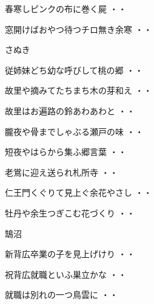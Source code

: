 \begin{shiika}春寒しピンクの布に巻く屍
\hfill{・・}\end{shiika}
\vspace{0.6cm}
\begin{shiika}窓開けばおやつ待つチロ無き余寒
\hfill{・・}\end{shiika}
\vspace{0.6cm}
さぬき
\begin{shiika}従姉妹どち幼な呼びして桃の郷
\hfill{・・}\end{shiika}
\begin{shiika}故里や摘みてたちまち木の芽和え
\hfill{・・}\end{shiika}
\begin{shiika}故里はお遍路の鈴あわあわと
\hfill{・・}\end{shiika}
\begin{shiika}朧夜や骨までしゃぶる瀬戸の味
\hfill{・・}\end{shiika}
\begin{shiika}短夜やはらから集ふ郷言葉
\hfill{・・}\end{shiika}
\begin{shiika}老鴬に迎え送られ札所寺
\hfill{・・}\end{shiika}
\begin{shiika}仁王門くぐりて見上ぐ余花やさし
\hfill{・・}\end{shiika}
\begin{shiika}牡丹や余生つぎこむ花づくり
\hfill{・・}\end{shiika}
\vspace{0.6cm}
鵠沼
\begin{shiika}新背広卒業の子を見上げけり
\hfill{・・}\end{shiika}
\begin{shiika}祝背広就職といふ巣立かな
\hfill{・・}\end{shiika}
\begin{shiika}就職は別れの一つ鳥雲に
\hfill{・・}\end{shiika}
\vspace{0.6cm}
